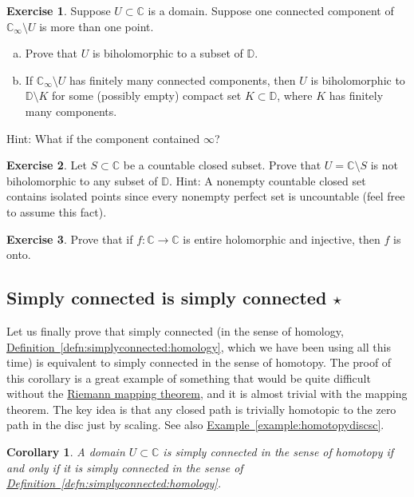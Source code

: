 \documentclass[12pt,openany]{book}
\newcommand{\C}{{\mathbb{C}}}
\newcommand{\D}{{\mathbb{D}}}
\theoremstyle{plain}
\newtheorem{cor}[thm]{Corollary}
\theoremstyle{remark}
\theoremstyle{definition}
\newenvironment{exbox}{%
    \def\FrameCommand{\vrule width 1pt \relax\hspace{10pt}}%
    \MakeFramed{\advance\hsize-\width\FrameRestore}%
}{%
    \endMakeFramed
}
\newenvironment{exparts}{%
    \leavevmode\begin{enumerate}[a),noitemsep,topsep=0pt,parsep=0pt,partopsep=0pt]
}{%
    \end{enumerate}
}
\theoremstyle{exercise}
\newtheorem{exercise}{Exercise}[section]
\theoremstyle{example}
\newcommand{\exampleref}[1]{\hyperref[#1]{Example~\ref*{#1}}}
\newcommand{\defnref}[1]{\hyperref[#1]{Definition~\ref*{#1}}}
\begin{document}
\begin{exbox}
\begin{exercise}
Suppose $U \subset \C$ is a domain.  Suppose one connected component of $\C_\infty
\setminus U$ is more than one point.
\begin{exparts}
\item
Prove that $U$ is biholomorphic to a subset of $\D$.
\item
If $\C_\infty \setminus U$ has finitely many connected components, then
$U$ is biholomorphic to $\D \setminus K$ for some (possibly empty) compact set
$K \subset \D$, where $K$ has finitely many components.
\end{exparts}
Hint: What if the component contained $\infty$?
\end{exercise}

\begin{exercise}
Let $S \subset \C$ be a countable closed subset.
Prove that $U = \C \setminus S$ is not biholomorphic
to any subset of $\D$.  Hint: A nonempty countable closed set contains isolated points
since every nonempty perfect set is uncountable
(feel free to assume this fact).
\end{exercise}

\begin{exercise}
Prove that 
if $f \colon \C \to \C$ is entire holomorphic and injective, then $f$ is
onto.
\end{exercise}
\end{exbox}

\subsection{Simply connected is simply connected \texorpdfstring{$\star$}{*}}

Let us finally prove that simply connected (in the sense of homology,
\defnref{defn:simplyconnected:homology}, which we have been using all this
time) is equivalent to simply connected in the sense of homotopy.
The proof of this corollary is a great example of something that would
be quite difficult without the
\hyperref[thm:RMT]{Riemann mapping theorem}, and it is almost
trivial with the mapping theorem.
The key idea is that any closed path is trivially homotopic to the zero path in the
disc just by scaling.  See also \exampleref{example:homotopydiscsc}.

\begin{cor} \label{cor:simplyconnhard}
A domain $U \subset \C$ is simply connected in the sense of homotopy
if and only if
it is simply connected in the sense of \defnref{defn:simplyconnected:homology}.
\end{cor}
\end{document}
